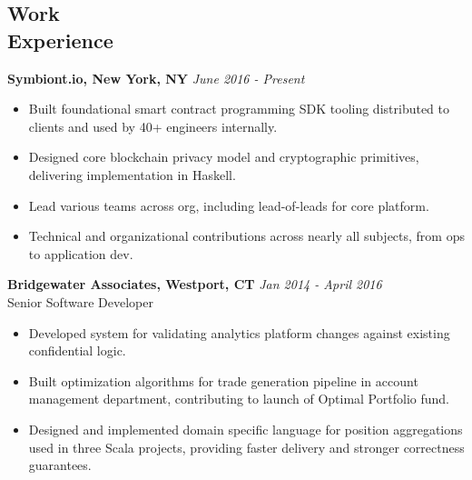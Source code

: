 \documentclass[margin]{res}
\begin{document}
 
 

\address{{\bf Contact} \\ jobs@aarontodd.name \\ (415) 847-0997 }

\address{{\bf Address} \\ 70 Pine St. Apt 928 \\ New York, NY 10005 }


\begin{resume} 
  
\section{Work \\ Experience}

{\bf Symbiont.io, New York, NY} \hfill \textit{June 2016 - Present} \\
\begin{itemize} 	\itemsep -2pt
\item Built foundational smart contract programming SDK tooling distributed to clients and used by 40+ engineers internally.
\item Designed core blockchain privacy model and cryptographic primitives, delivering implementation in Haskell.
\item Lead various teams across org, including lead-of-leads for core platform.
\item Technical and organizational contributions across nearly all subjects, from ops to application dev.
\end{itemize}

 {\bf Bridgewater Associates, Westport, CT} \hfill \textit{Jan 2014 - April 2016} \\
 Senior Software Developer
 \begin{itemize} \itemsep -2pt  %
 \item Developed system for validating analytics platform changes against existing confidential logic.
 \item Built optimization algorithms for trade generation pipeline in account management department, contributing to launch of Optimal Portfolio fund.
 \item Designed and implemented domain specific language for position aggregations used in three Scala projects, providing faster delivery and stronger correctness guarantees.
 \end{itemize}


\end{resume}
\end{document}

